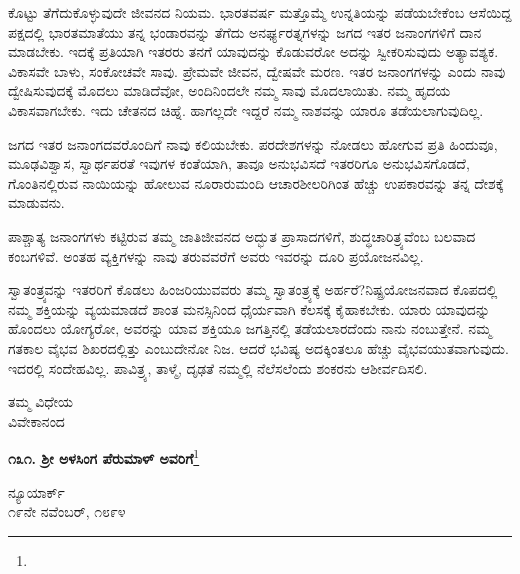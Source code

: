 ಕೊಟ್ಟು ತೆಗೆದುಕೊಳ್ಳುವುದೇ ಜೀವನದ ನಿಯಮ. ಭಾರತವರ್ಷ ಮತ್ತೊಮ್ಮೆ ಉನ್ನತಿಯನ್ನು ಪಡೆಯಬೇಕೆಂಬ ಆಸೆಯಿದ್ದ ಪಕ್ಷದಲ್ಲಿ ಭಾರತಮಾತೆಯು ತನ್ನ ಭಂಡಾರವನ್ನು ತೆಗೆದು ಅನರ್ಘ್ಯರತ್ನಗಳನ್ನು ಜಗದ ಇತರ ಜನಾಂಗಗಳಿಗೆ ದಾನ ಮಾಡಬೇಕು. ಇದಕ್ಕೆ ಪ್ರತಿಯಾಗಿ ಇತರರು ತನಗೆ ಯಾವುದನ್ನು ಕೊಡುವರೋ ಅದನ್ನು ಸ್ವೀಕರಿಸುವುದು ಅತ್ಯಾವಶ್ಯಕ. ವಿಕಾಸವೇ ಬಾಳು, ಸಂಕೋಚವೇ ಸಾವು. ಪ್ರೇಮವೇ ಜೀವನ, ದ್ವೇಷವೇ ಮರಣ. ಇತರ ಜನಾಂಗಗಳನ್ನು ಎಂದು ನಾವು ದ್ವೇಷಿಸುವುದಕ್ಕೆ ಮೊದಲು ಮಾಡಿದೆವೋ, ಅಂದಿನಿಂದಲೇ ನಮ್ಮ ಸಾವು ಮೊದಲಾಯಿತು. ನಮ್ಮ ಹೃದಯ ವಿಕಾಸವಾಗಬೇಕು. ಇದು ಚೇತನದ ಚಿಹ್ನೆ. ಹಾಗಲ್ಲದೇ ಇದ್ದರೆ ನಮ್ಮ ನಾಶವನ್ನು ಯಾರೂ ತಡೆಯಲಾಗುವುದಿಲ್ಲ.

\vspace{0.1cm}

ಜಗದ ಇತರ ಜನಾಂಗದವರೊಂದಿಗೆ ನಾವು ಕಲಿಯಬೇಕು. ಪರದೇಶಗಳನ್ನು ನೋಡಲು ಹೋಗುವ ಪ್ರತಿ ಹಿಂದುವೂ, ಮೂಢವಿಶ್ವಾಸ, ಸ್ವಾರ್ಥಪರತೆ ಇವುಗಳ ಕಂತೆಯಾಗಿ, ತಾವೂ ಅನುಭವಿಸದೆ ಇತರರಿಗೂ ಅನುಭವಿಸಗೊಡದೆ, ಗೊಂತಿನಲ್ಲಿರುವ ನಾಯಿಯನ್ನು ಹೋಲುವ ನೂರಾರುಮಂದಿ ಆಚಾರಶೀಲರಿಗಿಂತ ಹೆಚ್ಚು ಉಪಕಾರವನ್ನು ತನ್ನ ದೇಶಕ್ಕೆ ಮಾಡುವನು.

\vspace{0.1cm}

ಪಾಶ್ಚಾತ್ಯ ಜನಾಂಗಗಳು ಕಟ್ಟಿರುವ ತಮ್ಮ ಜಾತಿಜೀವನದ ಅದ್ಭುತ ಪ್ರಾಸಾದಗಳಿಗೆ, ಶುದ್ಧಚಾರಿತ್ರ್ಯವೆಂಬ ಬಲವಾದ ಕಂಬಗಳಿವೆ. ಅಂತಹ ವ್ಯಕ್ತಿಗಳನ್ನು ನಾವು ತರುವವರೆಗೆ ಅವರು\enginline{-} ಇವರನ್ನು ದೂರಿ ಪ್ರಯೋಜನವಿಲ್ಲ.

\vspace{0.1cm}

ಸ್ವಾತಂತ್ರ್ಯವನ್ನು ಇತರರಿಗೆ ಕೊಡಲು ಹಿಂಜರಿಯುವವರು ತಮ್ಮ ಸ್ವಾತಂತ್ರ್ಯಕ್ಕೆ ಅರ್ಹರೆ?\break ನಿಷ್ಪ್ರಯೋಜನವಾದ ಕೊಪದಲ್ಲಿ ನಮ್ಮ ಶಕ್ತಿಯನ್ನು ವ್ಯಯಮಾಡದೆ ಶಾಂತ ಮನಸ್ಸಿನಿಂದ ಧೈರ್ಯವಾಗಿ ಕೆಲಸಕ್ಕೆ ಕೈಹಾಕಬೇಕು. ಯಾರು ಯಾವುದನ್ನು ಹೊಂದಲು ಯೋಗ್ಯರೋ, ಅವರನ್ನು ಯಾವ ಶಕ್ತಿಯೂ ಜಗತ್ತಿನಲ್ಲಿ ತಡೆಯಲಾರದೆಂದು ನಾನು ನಂಬುತ್ತೇನೆ. ನಮ್ಮ ಗತಕಾಲ ವೈಭವ ಶಿಖರದಲ್ಲಿತ್ತು ಎಂಬುದೇನೋ ನಿಜ. ಆದರೆ ಭವಿಷ್ಯ ಅದಕ್ಕಿಂತಲೂ ಹೆಚ್ಚು ವೈಭವಯುತವಾಗುವುದು. ಇದರಲ್ಲಿ ಸಂದೇಹವಿಲ್ಲ. ಪಾವಿತ್ರ್ಯ, ತಾಳ್ಮೆ, ದೃಢತೆ ನಮ್ಮಲ್ಲಿ ನೆಲೆಸಲೆಂದು ಶಂಕರನು ಆಶೀರ್ವದಿಸಲಿ.

{\flushright
ತಮ್ಮ ವಿಧೇಯ\\ವಿವೇಕಾನಂದ\par}

\newpage

\begin{center}
\textbf{೧೩೧. ಶ‍್ರೀ ಅಳಸಿಂಗ ಪೆರುಮಾಳ್ ಅವರಿಗೆ}\footnote{}
\end{center}

\vspace{-0.5cm}

\begin{flushright}
ನ್ಯೂಯಾರ್ಕ್\\೧೯ನೇ ನವೆಂಬರ್, ೧೮೯೪
\end{flushright}

\vspace{-0.5cm}


